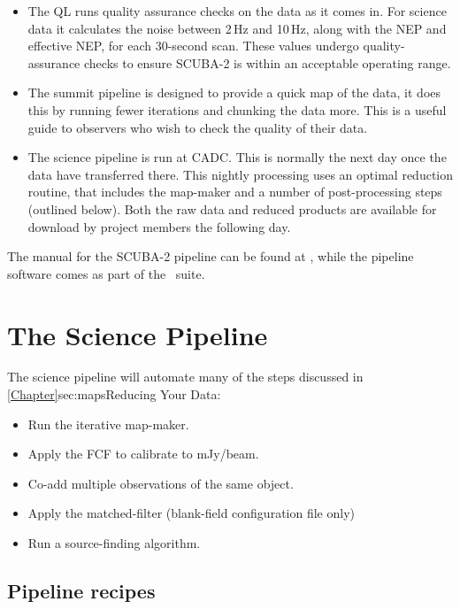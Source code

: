 \documentclass[11pt,oneside,chapters]{starlink}
\begin{document}
\begin{itemize}
\item The QL runs quality assurance checks on the data as it comes in.
For science data it calculates the noise between 2\,Hz and 10\,Hz,
along with the NEP and effective NEP, for each 30-second scan. These
values undergo quality-assurance checks to ensure SCUBA-2 is within
an acceptable operating range.
\item The summit pipeline is designed to provide a quick map of the
data, it does this by running fewer iterations and chunking the data
more. This is a useful guide to observers who wish to check the
quality of their data.
\item The science pipeline is run at CADC. This is normally the next
day once the data have transferred there.  This nightly processing
uses an optimal reduction routine, that includes the map-maker and a
number of post-processing steps (outlined below). Both the raw data
and reduced products are available for download by project members the
following day.
\end{itemize}

The manual for the SCUBA-2 pipeline can be found at \pipelinesun,
while the pipeline software comes as part of the \starlink\ suite.


\section{The Science Pipeline}

The science pipeline will automate many of the steps discussed in
\cref{Chapter}{sec:maps}{Reducing Your Data}:
\vspace{-0.3cm}
\begin{itemize}\itemsep-0.3em
\item Run the iterative map-maker.
\item Apply the FCF to calibrate to mJy/beam.
\item Co-add multiple observations of the same object.
\item Apply the matched-filter (blank-field configuration file only)
\item Run a source-finding algorithm.
\end{itemize}

\subsection{Pipeline recipes}
\label{sec:recipes}
\end{document}

